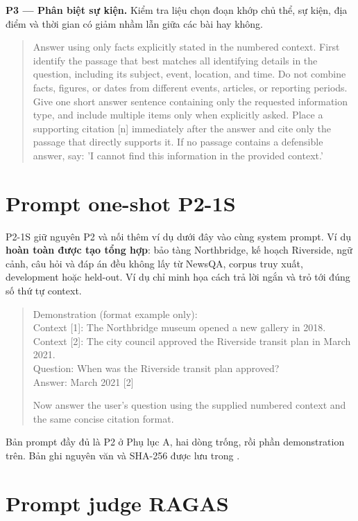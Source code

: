 \noindent\textbf{P3 --- Phân biệt sự kiện.} Kiểm tra liệu chọn đoạn khớp chủ
thể, sự kiện, địa điểm và thời gian có giảm nhầm lẫn giữa các bài hay không.
\begin{quote}\small\sloppy
Answer using only facts explicitly stated in the numbered context. First
identify the passage that best matches all identifying details in the
question, including its subject, event, location, and time. Do not combine
facts, figures, or dates from different events, articles, or reporting
periods. Give one short answer sentence containing only the requested
information type, and include multiple items only when explicitly asked.
Place a supporting citation [n] immediately after the answer and cite only
the passage that directly supports it. If no passage contains a defensible
answer, say: 'I cannot find this information in the provided context.'
\end{quote}

\section{Prompt one-shot P2-1S}

P2-1S giữ nguyên P2 và nối thêm ví dụ dưới đây vào cùng system prompt. Ví dụ
\textbf{hoàn toàn được tạo tổng hợp}: bảo tàng Northbridge, kế hoạch Riverside,
ngữ cảnh, câu hỏi và đáp án đều không lấy từ NewsQA, corpus truy xuất,
development hoặc held-out. Ví dụ chỉ minh họa cách trả lời ngắn và trỏ tới đúng
số thứ tự context.

\begin{quote}\small
Demonstration (format example only):\\
Context [1]: The Northbridge museum opened a new gallery in 2018.\\
Context [2]: The city council approved the Riverside transit plan in March
2021.\\
Question: When was the Riverside transit plan approved?\\
Answer: March 2021 [2]

Now answer the user's question using the supplied numbered context and the
same concise citation format.
\end{quote}

Bản prompt đầy đủ là P2 ở Phụ lục A, hai dòng trống, rồi phần demonstration
trên. Bản ghi nguyên văn và SHA-256 được lưu trong
.

\section{Prompt judge RAGAS}

